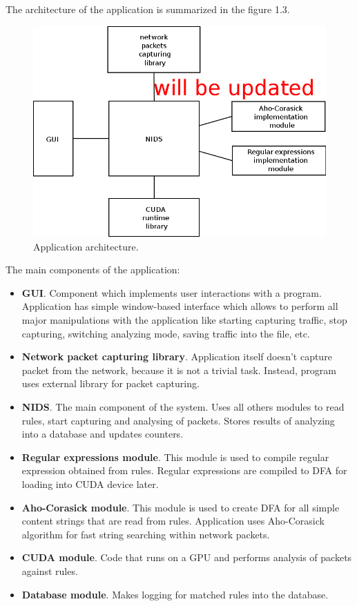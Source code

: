 \documentclass[thesis=M,english]{FITthesis}[2011/07/15]
\begin{document}
The architecture of the application is summarized in the figure 1.3.
\begin{figure}
\centering
\includegraphics[scale=0.5]{images/app_architecture.png}
\caption{Application architecture.}
\end{figure}

The main components of the application:
\begin{itemize}
\item \textbf{GUI}. Component which implements user interactions with a program. Application has simple window-based interface which allows to perform all major manipulations with the application like starting capturing traffic, stop capturing, switching analyzing mode, saving traffic into the file, etc.
\item \textbf{Network packet capturing library}. Application itself doesn't capture packet from the network, because it is not a trivial task. Instead, program uses external library for packet capturing. 
\item \textbf{NIDS}. The main component of the system. Uses all others modules to read rules, start capturing and analysing of packets. Stores results of analyzing into a database and updates counters.
\item \textbf{Regular expressions module}. This module is used to compile regular expression obtained from rules. Regular expressions are compiled to DFA for loading into CUDA device later.
\item \textbf{Aho-Corasick module}. This module is used to create DFA for all simple content strings that are read from rules. Application uses Aho-Corasick algorithm for fast string searching within network packets.
\item \textbf{CUDA module}. Code that runs on a GPU and performs analysis of packets against rules.
\item \textbf{Database module}. Makes logging for matched rules into the database.
\end{itemize}
\end{document}
